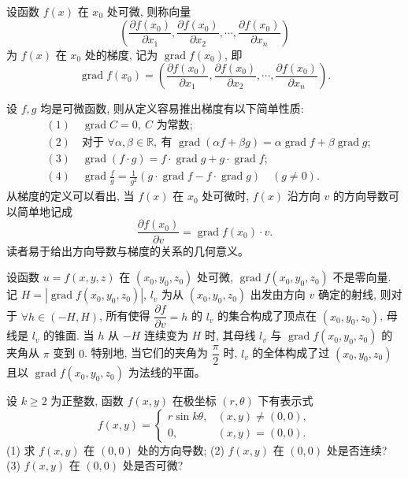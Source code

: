 \documentclass[UTF8,12pt,a4paper,fontset=fandol]{ctexart}
\begin{document}
\begin{definition}\label{course-definition-14-1-4}\quad 设函数 $f(x)$ 在 $x_0$ 处可微, 则称向量
\[
  \left(\frac{\partial f(x_0)}{\partial x_1},\frac{\partial f(x_0)}{\partial x_2},\cdots,\frac{\partial f(x_0)}{\partial x_n}\right)
\]
为 $f(x)$ 在 $x_0$ 处的梯度, 记为 $\operatorname{grad}f(x_0)$, 即
\[
  \operatorname{grad}f(x_0)=
  \left(\frac{\partial f(x_0)}{\partial x_1},\frac{\partial f(x_0)}{\partial x_2},\cdots,\frac{\partial f(x_0)}{\partial x_n}\right).
\]

设 $f,g$ 均是可微函数, 则从定义容易推出梯度有以下简单性质:
\[
\begin{aligned}
  &(1)\quad \operatorname{grad}C=0,\ C\text{ 为常数};\\
  &(2)\quad \text{对于 } \forall\alpha,\beta\in\mathbb R,\ \text{有 }
  \operatorname{grad}(\alpha f+\beta g)=\alpha\operatorname{grad}f+\beta\operatorname{grad}g;\\
  &(3)\quad \operatorname{grad}(f\cdot g)=f\cdot\operatorname{grad}g+g\cdot\operatorname{grad}f;\\
  &(4)\quad \operatorname{grad}\frac fg=\frac1{g^2}(g\cdot\operatorname{grad}f-f\cdot\operatorname{grad}g)\quad(g\ne0).
\end{aligned}
\]
从梯度的定义可以看出, 当 $f(x)$ 在 $x_0$ 处可微时, $f(x)$ 沿方向 $v$ 的方向导数可以简单地记成
\[
  \frac{\partial f(x_0)}{\partial v}=\operatorname{grad}f(x_0)\cdot v.
\]
读者易于给出方向导数与梯度的关系的几何意义。

设函数 $u=f(x,y,z)$ 在 $(x_0,y_0,z_0)$ 处可微, $\operatorname{grad}f(x_0,y_0,z_0)$ 不是零向量. 记 $H=|\operatorname{grad}f(x_0,y_0,z_0)|$, $l_v$ 为从 $(x_0,y_0,z_0)$ 出发由方向 $v$ 确定的射线, 则对于 $\forall h\in(-H,H)$, 所有使得 $\dfrac{\partial f}{\partial v}=h$ 的 $l_v$ 的集合构成了顶点在 $(x_0,y_0,z_0)$, 母线是 $l_v$ 的锥面. 当 $h$ 从 $-H$ 连续变为 $H$ 时, 其母线 $l_v$ 与 $\operatorname{grad}f(x_0,y_0,z_0)$ 的夹角从 $\pi$ 变到 $0$. 特别地, 当它们的夹角为 $\dfrac\pi2$ 时, $l_v$ 的全体构成了过 $(x_0,y_0,z_0)$ 且以 $\operatorname{grad}f(x_0,y_0,z_0)$ 为法线的平面。

\end{definition}
\begin{example}\label{course-example-14-1-7}\quad 设 $k\geqslant2$ 为正整数, 函数 $f(x,y)$ 在极坐标 $(r,\theta)$ 下有表示式
\[
  f(x,y)=
  \begin{cases}
    r\sin k\theta, &(x,y)\ne(0,0),\\
    0, &(x,y)=(0,0).
  \end{cases}
\]
(1) 求 $f(x,y)$ 在 $(0,0)$ 处的方向导数; (2) $f(x,y)$ 在 $(0,0)$ 处是否连续? (3) $f(x,y)$ 在 $(0,0)$ 处是否可微?

\end{example}
\end{document}
